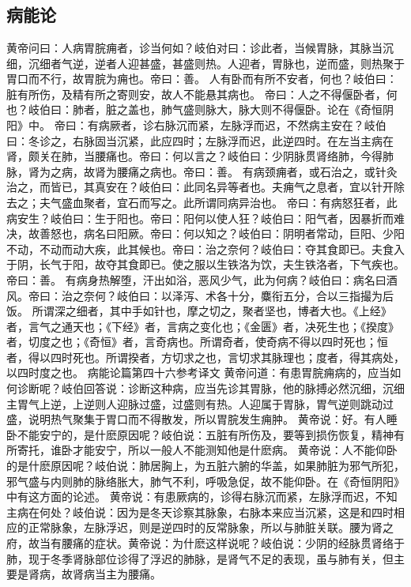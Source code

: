 \documentclass[a4paper,12pt,UTF8,twoside]{ctexbook}
\begin{document}
\part{}
\chapter{病能论}
黄帝问曰：人病胃脘痈者，诊当何如？岐伯对曰：诊此者，当候胃脉，其脉当沉细，沉细者气逆，逆者人迎甚盛，甚盛则热。人迎者，胃脉也，逆而盛，则热聚于胃口而不行，故胃脘为痈也。帝曰：善。
人有卧而有所不安者，何也？岐伯曰：脏有所伤，及精有所之寄则安，故人不能悬其病也。
帝曰：人之不得偃卧者，何也？岐伯曰：肺者，脏之盖也，肺气盛则脉大，脉大则不得偃卧。论在《奇恒阴阳》中。
帝曰：有病厥者，诊右脉沉而紧，左脉浮而迟，不然病主安在？岐伯曰：冬诊之，右脉固当沉紧，此应四时；左脉浮而迟，此逆四时。在左当主病在肾，颇关在肺，当腰痛也。帝曰：何以言之？岐伯曰：少阴脉贯肾络肺，今得肺脉，肾为之病，故肾为腰痛之病也。帝曰：善。
有病颈痈者，或石治之，或针灸治之，而皆已，其真安在？岐伯曰：此同名异等者也。夫痈气之息者，宜以针开除去之；夫气盛血聚者，宜石而写之。此所谓同病异治也。
帝曰：有病怒狂者，此病安生？岐伯曰：生于阳也。帝曰：阳何以使人狂？岐伯曰：阳气者，因暴折而难决，故善怒也，病名曰阳厥。帝曰：何以知之？岐伯曰：阴明者常动，巨阳、少阳不动，不动而动大疾，此其候也。帝曰：治之奈何？岐伯曰：夺其食即已。夫食入于阴，长气于阳，故夺其食即已。使之服以生铁洛为饮，夫生铁洛者，下气疾也。帝曰：善。
有病身热解堕，汗出如浴，恶风少气，此为何病？岐伯曰：病名曰酒风。帝曰：治之奈何？岐伯曰：以泽泻、术各十分，麋衔五分，合以三指撮为后饭。
所谓深之细者，其中手如针也，摩之切之，聚者坚也，博者大也。《上经》者，言气之通天也；《下经》者，言病之变化也；《金匮》者，决死生也；《揆度》者，切度之也；《奇恒》者，言奇病也。所谓奇者，使奇病不得以四时死也；恒者，得以四时死也。所谓揆者，方切求之也，言切求其脉理也；度者，得其病处，以四时度之也。
病能论篇第四十六参考译文
黄帝问道：有患胃脘痈病的，应当如何诊断呢？岐伯回答说：诊断这种病，应当先诊其胃脉，他的脉搏必然沉细，沉细主胃气上逆，上逆则人迎脉过盛，过盛则有热。人迎属于胃脉，胃气逆则跳动过盛，说明热气聚集于胃口而不得散发，所以胃脘发生痈肿。
黄帝说：好。有人睡卧不能安宁的，是什麽原因呢？岐伯说：五脏有所伤及，要等到损伤恢复，精神有所寄托，谁卧才能安宁，所以一般人不能测知他是什麽病。
黄帝说：人不能仰卧的是什麽原因呢？岐伯说：肺居胸上，为五脏六腑的华盖，如果肺脏为邪气所犯，邪气盛与内则肺的脉络胀大，肺气不利，呼吸急促，故不能仰卧。在《奇恒阴阳》中有这方面的论述。
黄帝说：有患厥病的，诊得右脉沉而紧，左脉浮而迟，不知主病在何处？岐伯说：因为是冬天诊察其脉象，右脉本来应当沉紧，这是和四时相应的正常脉象，左脉浮迟，则是逆四时的反常脉象，所以与肺脏关联。腰为肾之府，故当有腰痛的症状。黄帝说：为什麽这样说呢？岐伯说：少阴的经脉贯肾络于肺，现于冬季肾脉部位诊得了浮迟的肺脉，是肾气不足的表现，虽与肺有关，但主要是肾病，故肾病当主为腰痛。
\end{document}
